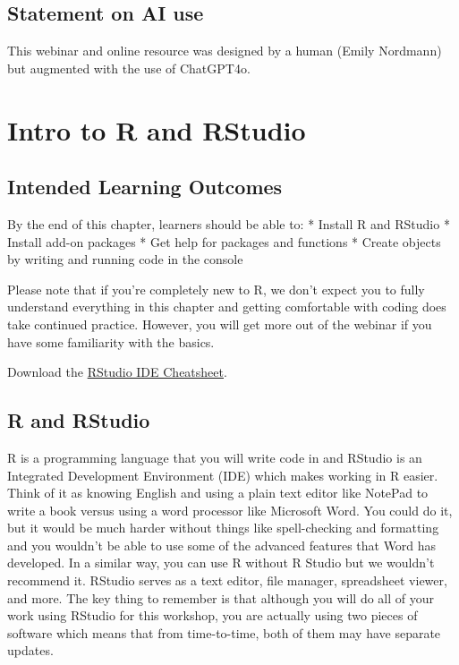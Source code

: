 \documentclass[
  oneside]{book}
\begin{document}
\section{Statement on AI use}\label{statement-on-ai-use}

This webinar and online resource was designed by a human (Emily Nordmann) but augmented with the use of ChatGPT4o.

\chapter{Intro to R and RStudio}\label{intro}

\section{Intended Learning Outcomes}\label{ilo-intro}

By the end of this chapter, learners should be able to:
* Install R and RStudio
* Install add-on packages
* Get help for packages and functions
* Create objects by writing and running code in the console

Please note that if you're completely new to R, we don't expect you to fully understand everything in this chapter and getting comfortable with coding does take continued practice. However, you will get more out of the webinar if you have some familiarity with the basics.

Download the \href{https://raw.githubusercontent.com/rstudio/cheatsheets/main/rstudio-ide.pdf}{RStudio IDE Cheatsheet}.

\section{R and RStudio}\label{intro-r-rstudio}

R is a programming language that you will write code in and RStudio is an Integrated Development Environment (IDE{}) which makes working in R easier. Think of it as knowing English and using a plain text editor like NotePad to write a book versus using a word processor like Microsoft Word. You could do it, but it would be much harder without things like spell-checking and formatting and you wouldn't be able to use some of the advanced features that Word has developed. In a similar way, you can use R without R Studio but we wouldn't recommend it. RStudio serves as a text editor, file manager, spreadsheet viewer, and more. The key thing to remember is that although you will do all of your work using RStudio for this workshop, you are actually using two pieces of software which means that from time-to-time, both of them may have separate updates.
\end{document}
